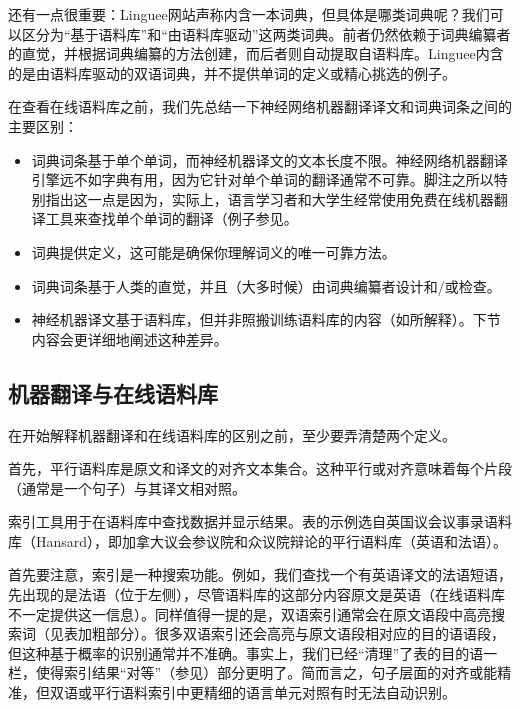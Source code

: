 \documentclass[output=paper,colorlinks,citecolor=brown]{langscibook}
\begin{document}
还有一点很重要：Linguee网站声称内含一本词典，但具体是哪类词典呢？我们可以区分为“基于语料库”和“由语料库驱动”这两类词典。前者仍然依赖于词典编纂者的直觉，并根据词典编纂的方法创建，而后者则自动提取自语料库。Linguee内含的是由语料库驱动的双语词典，并不提供单词的定义或精心挑选的例子。

在查看在线语料库之前，我们先总结一下神经网络机器翻译译文和词典词条之间的主要区别：\largerpage[-2]

\begin{itemize}
\item  词典词条基于单个单词，而神经机器译文的文本长度不限。神经网络机器翻译引擎远不如字典有用，因为它针对单个单词的翻译通常不可靠。脚注{之所以特别指出这一点是因为，实际上，语言学习者和大学生经常使用免费在线机器翻译工具来查找单个单词的翻译（例子参见\citealt{JolleyMaimone2022, DorstBouman2022}}。
\item  词典提供定义，这可能是确保你理解词义的唯一可靠方法。
\item  词典词条基于人类的直觉，并且（大多时候）由词典编纂者设计和/或检查。
\item  神经机器译文基于语料库，但并非照搬训练语料库的内容（如所解释）。下节内容会更详细地阐述这种差异。
\end{itemize}



\subsection{机器翻译与在线语料库} 
在开始解释机器翻译和在线语料库的区别之前，至少要弄清楚两个定义。

首先，平行语料库是原文和译文的对齐文本集合。这种平行或对齐意味着每个片段（通常是一个句子）与其译文相对照。

索引工具用于在语料库中查找数据并显示结果。表的示例选自英国议会议事录语料库（Hansard），即加拿大议会参议院和众议院辩论的平行语料库（英语和法语）。

首先要注意，索引是一种搜索功能。例如，我们查找一个有英语译文的法语短语，先出现的是法语（位于左侧），尽管语料库的这部分内容原文是英语（在线语料库不一定提供这一信息）。同样值得一提的是，双语索引通常会在原文语段中高亮搜索词（见表加粗部分）。很多双语索引还会高亮与原文语段相对应的目的语语段，但这种基于概率的识别通常并不准确。事实上，我们已经“清理”了表的目的语一栏，使得索引结果“对等”（参见）部分更明了。简而言之，句子层面的对齐或能精准，但双语或平行语料索引中更精细的语言单元对照有时无法自动识别。
\end{document}
